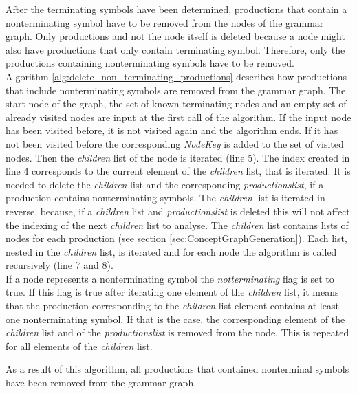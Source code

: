 After the terminating symbols have been determined, productions that contain a nonterminating symbol have to be removed from the nodes of the grammar graph. Only productions and not the node itself is deleted because a node might also have productions that only contain terminating symbol. Therefore, only the productions containing nonterminating symbols have to be removed.\\
Algorithm \ref{alg:delete_non_terminating_productions}  describes how productions that include nonterminating symbols are removed from the grammar graph.
The start node of the graph, the set of known terminating nodes and an empty set of already visited nodes are input at the first call of the algorithm.
If the input node has been visited before, it is not visited again and the algorithm ends.
If it has not been visited before the corresponding \textit{Node\textunderscore Key} is added to the set of visited nodes.
Then the \textit{children} list of the node is iterated (line 5).
The index created in line 4 corresponds to the current element of the \textit{children} list, that is iterated.
It is needed to delete the \textit{children} list and the corresponding \textit{productions\textunderscore list}, if a production contains nonterminating symbols. The \textit{children} list is iterated in reverse, because, if a \textit{children} list and \textit{productions\textunderscore list} is deleted this will not affect the indexing of the next \textit{children} list to analyse.
The \textit{children} list contains lists of nodes for each production (see section \ref{sec:ConceptGraphGeneration}). Each list, nested in the \textit{children} list, is iterated and for each node the algorithm is called recursively (line 7 and 8).\\
If a node represents a nonterminating symbol the \textit{not\textunderscore terminating} flag is set to true.
If this flag is true after iterating one element of the \textit{children} list, it means that the production corresponding to the \textit{children} list element contains at least one nonterminating symbol.
If that is the case, the corresponding element of the \textit{children} list and of the \textit{productions\textunderscore list} is removed from the node.
This is repeated for all elements of the \textit{children} list.

As a result of this algorithm, all productions that contained nonterminal symbols have been removed from the grammar graph.

